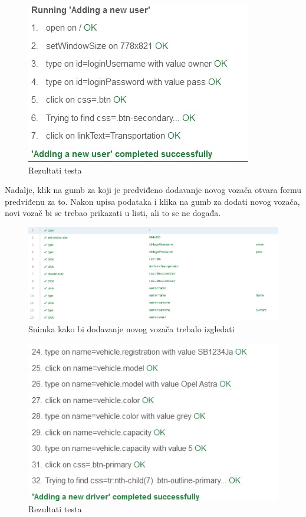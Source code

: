 			\begin{figure}[H]
				\includegraphics[width=\textwidth]{slike/addingANewUserResults.JPG}
				\caption{Rezultati testa}
				\label{addingANewUserResults}
			\end{figure}
			
			Nadalje, klik na gumb za koji je predviđeno dodavanje novog vozača otvara formu predviđenu za to. Nakon upisa podataka i klika na gumb za dodati novog vozača, novi vozač bi se trebao prikazati u listi, ali to se ne događa.
			
			\begin{figure}[H]
				\includegraphics[width=\textwidth]{slike/addingANewDriverTest.JPG}
				\caption{Snimka kako bi dodavanje novog vozača trebalo izgledati}
				\label{addingANewDriverTest}
			\end{figure}
			
			\begin{figure}[H]
				\includegraphics[width=\textwidth]{slike/addingANewDriverResults.JPG}
				\caption{Rezultati testa}
				\label{addingANewDriverResults}
			\end{figure}
			
